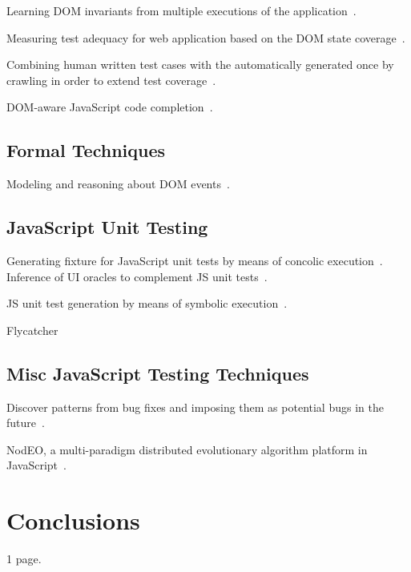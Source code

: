 \documentclass[sigconf,review,anonymous]{acmart}
\begin{document}
Learning DOM invariants from multiple executions of the application~\cite{pattabiraman2010dodom}.

Measuring test adequacy for web application based on the DOM state coverage~\cite{mirzaaghaei2014dom}.

Combining human written test cases with the automatically generated once by crawling in order to extend test coverage~\cite{milani2014leveraging}.

DOM-aware JavaScript code completion~\cite{bajaj2014dompletion}. 

\subsection{Formal Techniques}
\label{sub.sec.formal}

Modeling and reasoning about DOM events~\cite{lerner2012modeling}.

\subsection{JavaScript Unit Testing}
\label{sub.sec.js.unit.test}

Generating fixture for JavaScript unit tests by means of concolic execution~\cite{amin:ase15}. Inference of UI oracles to complement JS unit tests~\cite{icst16}.

JS unit test generation by means of symbolic execution~\cite{tanida2014automatic}.

Flycatcher~\cite{deautomatic}

\subsection{Misc JavaScript Testing Techniques}
\label{sub.sec.misc.test.tech}

Discover patterns from bug fixes and imposing them as potential bugs in the future~\cite{quinn:fse16}. 

NodEO, a multi-paradigm distributed evolutionary algorithm platform in JavaScript~\cite{merelo2014nodeo}.

\section{Conclusions}
\label{sec:concl}
1 page.


 
\end{document}
